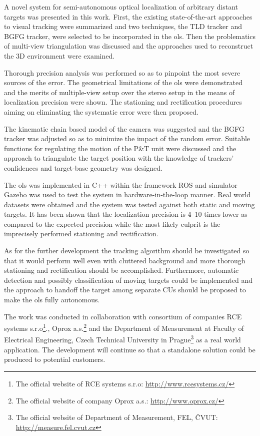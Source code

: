 A novel system for semi-autonomous optical localization of arbitrary distant targets was presented in this work. First, the existing state-of-the-art approaches to visual tracking were summarized and two techniques, the TLD tracker and BGFG tracker, were selected to be incorporated in the \gls{ols}. Then the problematics of multi-view triangulation was discussed and the approaches used to reconstruct the 3D environment were examined.

Thorough precision analysis was performed so as to pinpoint the most severe sources of the error. The geometrical limitations of the \gls{ols} were demonstrated and the merits of multiple-view setup over the stereo setup in the means of localization precision were shown. The stationing and rectification procedures aiming on eliminating the systematic error were then proposed. 

The kinematic chain based model of the camera was suggested and the BGFG tracker was adjusted so as to minimize the impact of the random error. Suitable functions for regulating the motion of the P\&T unit were discussed and the approach to triangulate the target position with the knowledge of trackers' confidences and target-base geometry was designed.

The \gls{ols} was implemented in C++ within the framework ROS and simulator Gazebo was used to test the system in hardware-in-the-loop manner. Real world datasets were obtained and the system was tested against both static and moving targets. It has been shown that the localization precision is 4--10 times lower as compared to the expected precision while the most likely culprit is the imprecisely performed stationing and rectification.

As for the further development the tracking algorithm should be investigated so that it would perform well even with cluttered background and more thorough stationing and rectification should be accomplished. Furthermore, automatic detection and possibly classification of moving targets could be implemented and the approach 
to handoff the target among separate CUs should be proposed to make the \gls{ols} fully autonomous.

The work was conducted in collaboration with consortium of companies RCE systems s.r.o\footnote{The official website of RCE systems s.r.o: \url{http://www.rcesystems.cz/}}., Oprox a.s.\footnote{The official website of company Oprox a.s.: \url{http://www.oprox.cz/}} and the Department of Measurement at Faculty of Electrical Engineering, Czech Technical University in Prague\footnote{The official website of Department of Measurement, FEL, ČVUT: \url{http://measure.fel.cvut.cz}} as a real world application. The development will continue so that a standalone solution could be produced to potential customers.
